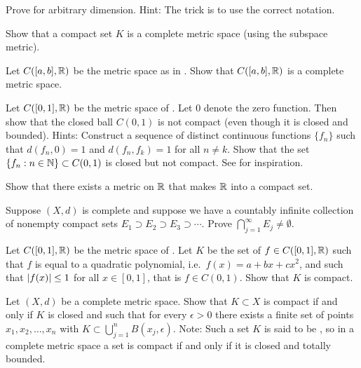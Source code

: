 \begin{exercise}
Prove  for arbitrary dimension.
Hint: The trick is to use the correct notation.
\end{exercise}

\begin{exercise}
Show that a compact set $K$ is a complete metric space (using the subspace
metric).
\end{exercise}

\begin{exercise} \label{exercise:CabRcomplete}
Let $C([a,b],{\mathbb{R}})$ be the metric space as in .  Show that
$C([a,b],{\mathbb{R}})$ is a complete metric space.
\end{exercise}

\begin{exercise}[Challenging] \label{exercise:msclbounnotcompt}
Let $C([0,1],{\mathbb{R}})$ be the metric space of .  Let $0$
denote the zero function.  Then show that the closed ball
$C(0,1)$ is not compact (even though it is closed and bounded).
Hints: Construct a sequence of distinct continuous functions $\{ f_n \}$ such that
$d(f_n,0) = 1$ and $d(f_n,f_k) = 1$ for all $n \not= k$.  Show that
the set $\{ f_n : n \in {\mathbb{N}} \} \subset C(0,1)$ is closed but not compact.
See  for inspiration.
\end{exercise}

\begin{exercise}[Challenging]
Show that there exists a metric on ${\mathbb{R}}$ that makes ${\mathbb{R}}$ into a compact set.
\end{exercise}

\begin{exercise}
Suppose $(X,d)$ is complete and suppose we have a countably infinite
collection of nonempty compact sets $E_1 \supset E_2 \supset E_3 \supset
\cdots$.  Prove $\bigcap_{j=1}^\infty E_j \not= \emptyset$.
\end{exercise}

\begin{exercise}[Challenging]
Let $C([0,1],{\mathbb{R}})$ be the metric space of .
Let $K$ be the set of $f \in C([0,1],{\mathbb{R}})$ such that
$f$ is equal to a quadratic polynomial, i.e.\ $f(x) = a+bx+cx^2$, and such that
$\left\lvert {f(x)} \right\rvert \leq 1$ for all $x \in [0,1]$,
that is $f \in C(0,1)$.  Show that $K$ is compact.
\end{exercise}

\begin{exercise}[Challenging] \label{exercise:mstotbound}
Let $(X,d)$ be a complete metric space.
Show that $K \subset X$ is compact if and only if $K$ is closed
and such that for every $\epsilon > 0$
there exists a finite set of points $x_1,x_2,\ldots,x_n$ with
$K \subset \bigcup_{j=1}^n B(x_j,\epsilon)$.
Note: Such a set $K$ is said to be \emph{},
so in a complete metric space a set is compact if and only
if it is closed and totally bounded.
\end{exercise}

